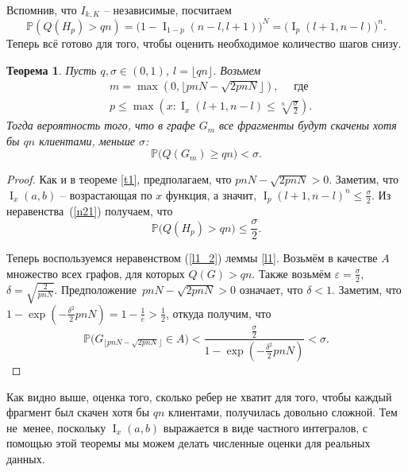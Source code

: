 \documentclass{matmex-diploma-custom}
\newcommand{\PRob}{\mathbb P}
\newcommand{\leqs}{\leqslant}
\newcommand{\geqs}{\geqslant}
\newcommand{\eps}{\varepsilon}
\DeclareMathOperator{\I}{I}
\newtheorem{theorem}{Теорема}
\theoremstyle{named}
\begin{document}
Вспомнив, что $I_{k,K}$ -- независимые, посчитаем
\begin{equation}\label{n21}
\PRob(Q(H_p) > qn) = \big(1 - \I_{1-p}(n-l, l+1)\big)^N = \big(\I_{p}(l+1, n-l)\big)^n.
\end{equation}
Теперь всё готово для того, чтобы оценить необходимое количество шагов снизу.

\begin{theorem}\label{t2}
Пусть $q, \sigma \in (0, 1)$, $l = \lfloor qn \rfloor$. Возьмем 
\begin{align}
& m = \max(0, \lfloor pnN - \sqrt{2pnN} \rfloor), \quad \text{ где} \\
& p \leqs \max\left(x :  \I_x(l+1, n-l) \leqs \sqrt[n]{\frac\sigma{2}} \right).
\end{align}
Тогда вероятность того, что в графе $G_m$ все фрагменты будут скачены хотя бы $qn$ клиентами, меньше $\sigma$:
\begin{equation}
\PRob\big(Q(G_m) \geqs qn\big) < \sigma.
\end{equation}
\end{theorem}


\begin{proof}
Как и в теореме \ref{t1}, предполагаем, что $pnN - \sqrt{2pnN} > 0$.
Заметим, что~$\I_x(a,b)$ -- возрастающая по $x$ функция, а значит, $\I_p(l+1, n-l)^n \leqs \frac\sigma{2}$. 
Из неравенства~(\ref{n21}) получаем, что
\begin{equation}
\PRob\big(Q(H_p) > qn\big) \leqs \frac\sigma{2}.
\end{equation}

Теперь воспользуемся неравенством (\ref{l1_2}) леммы \ref{l1}.
Возьмём в качестве $A$ множество всех графов, для которых $Q(G) > qn$.
Также возьмём $\eps = \frac\sigma{2}$, $\delta = \sqrt{\frac{2}{pnN}}$.
Предположение~$pnN - \sqrt{2pnN} > 0$ означает, что $\delta < 1$.
Заметим, что $1 - \exp\left(-\frac{\delta^2}{2}pnN\right) = 1 - \frac{1}{e} > \frac{1}{2}$, откуда получим, что
\begin{equation}
\PRob\big(G_{\lfloor pnN - \sqrt{2pnN} \rfloor} \in A\big) 
	< 
\frac{\frac\sigma{2}}{1 - \exp\left(-\frac{\delta^2}{2}pnN\right)}
	<
\sigma.
\end{equation}
\end{proof}

Как видно выше, оценка того, сколько ребер не хватит для того, 
чтобы каждый фрагмент был скачен хотя бы $qn$ клиентами, получилась довольно сложной.
Тем не~менее, поскольку $\I_x(a, b)$ выражается в виде частного интегралов, 
с помощью этой теоремы мы можем делать численные оценки для реальных данных.
\end{document}
